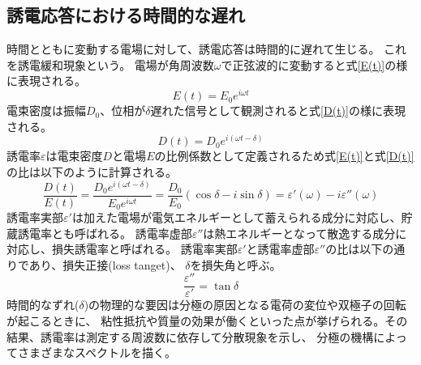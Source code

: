 \documentclass[dvipdfmx,12pt,a4paper]{jreport}
\begin{document}
			\subsection{誘電応答における時間的な遅れ}
			時間とともに変動する電場に対して、誘電応答は時間的に遅れて生じる。
			これを誘電緩和現象という。
			電場が角周波数$\omega$で正弦波的に変動すると式\ref{E(t)}の様に表現される。
			\begin{equation}
				E(t)=E_0 e^{i\omega t}
				\label{E(t)}
			\end{equation}
			電束密度は振幅$D_0$、位相が$\delta$遅れた信号として観測されると式\ref{D(t)}の様に表現される。
			\begin{equation}
				D(t)=D_0 e^{i(\omega t-\delta)}
				\label{D(t)}
			\end{equation}
			誘電率$\varepsilon$は電束密度$D$と電場$E$の比例係数として定義されるため式\ref{E(t)}と式\ref{D(t)}
			の比は以下のように計算される。
			\begin{equation}
				\frac{D(t)}{E(t)}=\frac{D_0e^{i(\omega t-\delta)}}{E_0 e^{i\omega t}}
				=\frac{D_0}{E_0}\left(\cos\delta-i\sin\delta\right)=\varepsilon'(\omega)-i\varepsilon''(\omega)
			\end{equation}
			誘電率実部$\varepsilon'$は加えた電場が電気エネルギーとして蓄えられる成分に対応し、貯蔵誘電率とも呼ばれる。
			誘電率虚部$\varepsilon''$は熱エネルギーとなって散逸する成分に対応し、損失誘電率と呼ばれる。
			誘電率実部$\varepsilon'$と誘電率虚部$\varepsilon''$の比は以下の通りであり、損失正接(loss tanget)、
			$\delta$を損失角と呼ぶ。
			\begin{equation}
				\frac{\varepsilon''}{\varepsilon'}=\tan\delta
				\label{tandel}
			\end{equation}
			時間的なずれ($\delta$)の物理的な要因は分極の原因となる電荷の変位や双極子の回転が起こるときに、
			粘性抵抗や質量の効果が働くといった点が挙げられる。その結果、誘電率は測定する周波数に依存して分散現象を示し、
			分極の機構によってさまざまなスペクトルを描く。
\end{document}
